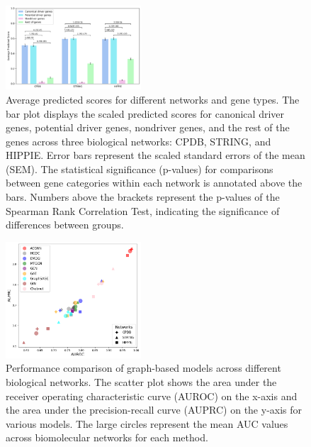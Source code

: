 \begin{figure}[ht]
	\centering
	\includegraphics[width=0.45\textwidth]{images/average_predicted_scores.png}
	\captionsetup{font=footnotesize}
	\caption{Average predicted scores for different networks and gene types. The bar plot displays the scaled predicted scores for canonical driver genes, potential driver genes, nondriver genes, and the rest of the genes across three biological networks: CPDB, STRING, and HIPPIE. Error bars represent the scaled standard errors of the mean (SEM). The statistical significance (p-values) for comparisons between gene categories within each network is annotated above the bars. Numbers above the brackets represent the p-values of the Spearman Rank Correlation Test, indicating the significance of differences between groups.}
	
	\label{fig:predicted_scores}
\end{figure}


\begin{figure}[ht]
	\centering
		\scriptsize
	\captionsetup{font=footnotesize}
	\includegraphics[width=0.45\textwidth]{images/roc_pr.png}
	\caption{
		Performance comparison of graph-based models across different biological networks. 
		The scatter plot shows the area under the receiver operating characteristic curve (AUROC) on the x-axis and the area under the precision-recall curve (AUPRC) on the y-axis for various models. The large circles represent the mean AUC values across biomolecular networks for each method.
	}
	\label{fig:auroc_auprc_comparison}
\end{figure}


